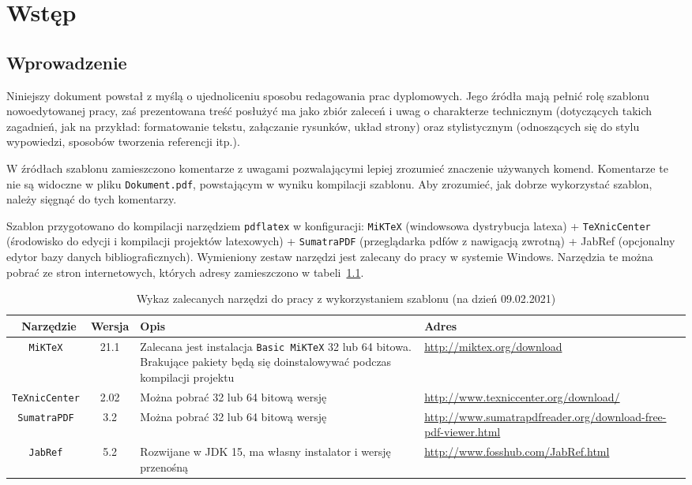 \chapter{Wstęp}
\section{Wprowadzenie}
Niniejszy dokument powstał z myślą o ujednoliceniu sposobu redagowania prac dyplomowych. Jego źródła mają pełnić rolę szablonu nowoedytowanej pracy, zaś prezentowana treść posłużyć ma jako zbiór zaleceń i uwag o charakterze technicznym (dotyczących takich zagadnień, jak na przykład: formatowanie tekstu, załączanie rysunków, układ strony) oraz stylistycznym (odnoszących się do stylu wypowiedzi, sposobów tworzenia referencji itp.).

W źródłach szablonu zamieszczono komentarze z uwagami pozwalającymi lepiej zrozumieć znaczenie używanych komend. Komentarze te nie są widoczne w pliku \texttt{Dokument.pdf}, powstającym w wyniku kompilacji szablonu. Aby zrozumieć, jak dobrze wykorzystać szablon, należy sięgnąć do tych komentarzy.

Szablon przygotowano do kompilacji narzędziem \texttt{pdflatex} w konfiguracji: \texttt{MiKTeX} (windowsowa dystrybucja latexa) + \texttt{TeXnicCenter} (środowisko do edycji i kompilacji projektów latexowych) + \texttt{SumatraPDF} (przeglądarka pdfów z nawigacją zwrotną) + JabRef (opcjonalny edytor bazy danych bibliograficznych). Wymieniony zestaw narzędzi jest zalecany do pracy w systemie Windows. Narzędzia te można pobrać ze stron internetowych, których adresy zamieszczono w tabeli~\ref{tab:narzedzia}.

\begin{table}[htb] \small
\centering
\caption{Wykaz zalecanych narzędzi do pracy z wykorzystaniem szablonu (na dzień 09.02.2021)}
\label{tab:narzedzia}
\begin{tabularx}{\linewidth}{|c|c|X|p{5.5cm}|} \hline\
Narzędzie & Wersja & Opis & Adres \\ \hline\hline
\texttt{MiKTeX} & 21.1 & Zalecana jest instalacja \texttt{Basic MiKTeX} 32 lub 64 bitowa. Brakujące pakiety będą się doinstalowywać podczas kompilacji projektu &
\url{http://miktex.org/download} \\ \hline
\texttt{TeXnicCenter} & 2.02 &  Można pobrać 32 lub 64 bitową wersję & \url{http://www.texniccenter.org/download/} \\ \hline
\texttt{SumatraPDF} & 3.2 & Można pobrać 32 lub 64 bitową wersję & \url{http://www.sumatrapdfreader.org/download-free-pdf-viewer.html} \\ \hline
\texttt{JabRef} & 5.2 & Rozwijane w JDK 15, ma własny instalator i wersję przenośną & \url{http://www.fosshub.com/JabRef.html} \\ \hline
\end{tabularx}
\end{table}

